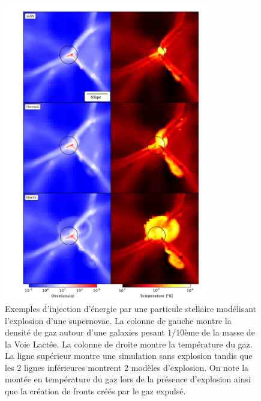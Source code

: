 \begin{figure}[htbp]
	\centering
		\includegraphics[height=13cm]{figs/SN.png}
	\caption[Exemples d'injection d'énergie par une particule stellaire modélisant l'explosion d'une supernovae. ]{Exemples d'injection d'énergie par une particule stellaire modélisant l'explosion d'une supernovae. La colonne de gauche montre la densité de gaz autour d'une galaxies pesant $1/10$ème de la masse de la Voie Lactée. La colonne de droite montre la température du gaz. La ligne supérieur montre une simulation sans explosion tandis que les 2 lignes inférieures montrent 2 modèles d'explosion. On note la montée en température du gaz lors de la présence d'explosion ainsi que la création de fronts créés par le gaz expulsé.}
	\label{f:SN}
\end{figure}

